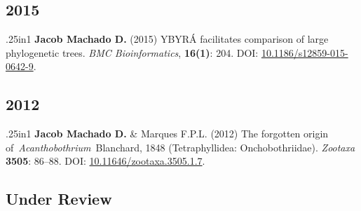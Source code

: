 \documentclass[11pt, letterpaper, sans]{moderncv}
\begin{document}
\subsection{2015}

    {\setlength{\parskip}{.5em}\renewcommand{\baselinestretch}{2.0}\begin{hangparas}{.25in}{1}
		\textbf{Jacob Machado D.} (2015) YBYRÁ facilitates comparison of large phylogenetic trees. \emph{BMC Bioinformatics}, \textbf{16(1)}: 204. DOI: \href{https://doi.org/10.1186/s12859-015-0642-9}{10.1186/s12859-015-0642-9}.
	\end{hangparas}}


\subsection{2012}

    {\setlength{\parskip}{.5em}\renewcommand{\baselinestretch}{2.0}\begin{hangparas}{.25in}{1}
		\textbf{Jacob Machado D.} \& Marques F.P.L. (2012) The forgotten origin of~\emph{Acanthobothrium}~Blanchard, 1848 (Tetraphyllidea: Onchobothriidae). \emph{Zootaxa} \textbf{3505}: 86--88. DOI: \href{https://doi.org/10.11646/zootaxa.3505.1.7}{10.11646/zootaxa.3505.1.7}.
	\end{hangparas}}


%


\subsection{Under Review}
\end{document}

